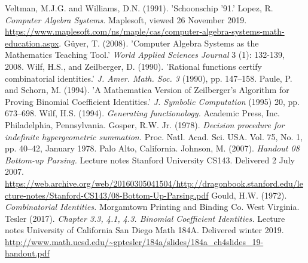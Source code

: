 Veltman, M.J.G. and Williams, D.N. (1991). 'Schoonschip ’91.'\label{Ref: veltman}
Lopez, R. \textit{Computer Algebra Systems.} Maplesoft, viewed 26 November 2019. \url{https://www.maplesoft.com/ns/maple/cas/computer-algebra-systems-math-education.aspx}.\label{Ref: maple}
Güyer, T. (2008). 'Computer Algebra Systems as the Mathematics Teaching Tool.' \textit{World Applied Sciences Journal} 3 (1): 132-139, 2008.\label{Ref: computeralgebra}
Wilf, H.S., and Zeilberger, D. (1990). 'Rational functions certify combinatorial identities.' \textit{J. Amer. Math. Soc. 3} (1990), pp. 147–158.\label{Ref: wz}
Paule, P. and Schorn, M. (1994). 'A Mathematica Version of Zeilberger's Algorithm for Proving Binomial Coefficient Identities.' \textit{J. Symbolic Computation} (1995) 20, pp. 673--698.\label{Ref: mathematica}
Wilf, H.S. (1994). \textit{Generating functionology.} Academic Press, Inc. Philadelphia, Pennsylvania.\label{Ref: wilf}
Gosper, R.W. Jr. (1978). \textit{Decision procedure for indefinite hypergeometric summation.} Proc. Natl. Acad. Sci. USA. Vol. 75, No. 1, pp. 40--42, January 1978. Palo Alto, California.\label{Ref: gosper}
Johnson, M. (2007). \textit{Handout 08 Bottom-up Parsing.} Lecture notes Stanford University CS143. Delivered 2 July 2007. \url{https://web.archive.org/web/20160305041504/http://dragonbook.stanford.edu/lecture-notes/Stanford-CS143/08-Bottom-Up-Parsing.pdf}\label{Ref: parser}
Gould, H.W. (1972). \textit{Combinatorial Identities.} Morgamtown Printing and Binding Co. West Virginia.\label{Ref: gould}
Tesler (2017). \textit{Chapter 3.3, 4.1, 4.3. Binomial Coefficient Identities.} Lecture notes University of California San Diego Math 184A. Delivered winter 2019. \url{http://www.math.ucsd.edu/~gptesler/184a/slides/184a_ch4slides_19-handout.pdf}\label{Ref: tesler}
